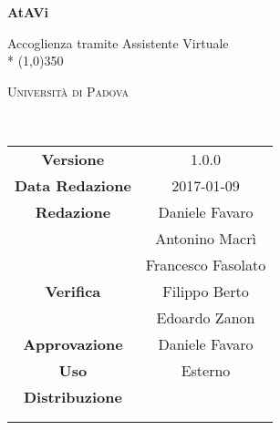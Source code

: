 \documentclass[a4paper,12pt]{article}
\author{Francesco Fasolato, Antonino Macrì, Giacomo Zecchin}
\date{12/12/2016}
\begin{document}
	\begin{titlepage}
		\centering
		{\huge\bfseries AtAVi\par}
		Accoglienza tramite Assistente Virtuale \\*
		\line(1,0){350} \\
		{\scshape\LARGE Università di Padova \par}
		\vspace{1cm}
		{\scshape\Large \pianodiprogettoi\ \par}
		\logo
		\newpage
		\begin{tabular}{c|c}
			{\hfill \textbf{Versione}} 			& 1.0.0			\\ 
			{\hfill\textbf{Data Redazione}} 	& 2017-01-09 		\\ 
			{\hfill\textbf{Redazione}} 			& Daniele Favaro \\ & Antonino Macrì \\ & Francesco Fasolato \\ 
			{\hfill\textbf{Verifica}} 				& Filippo Berto \\ & Edoardo Zanon \\ 
			{\hfill\textbf{Approvazione}} 		& Daniele Favaro				\\
			{\hfill\textbf{Uso}} 						& Esterno 			\\
			{\hfill\textbf{Distribuzione}} 		& \vardanega \\ & \cardin \\ & \prop \\
		\end{tabular}
	\end{titlepage}
	
	\pagestyle{myfront}
	\newpage	
			

	\newpage
		\tableofcontents 	%
	\newpage
		\listoftables 		%
	\newpage	
		\listoffigures		%
	
	\label{LastFrontPage}
		\newpage
		\pagestyle{mymain}
			
		\newpage
			
		\newpage	
			
		\newpage
			
		\newpage			
			
		\newpage			
			
		\newpage			
			
		\newpage
			

	\label{LastPage}
\end{document}
